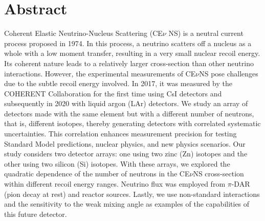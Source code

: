 \chapter*{Abstract}

Coherent Elastic Neutrino-Nucleus Scattering (CE$\nu$ NS) is a neutral current process proposed in 1974. In this process, a neutrino scatters off a nucleus as a whole with a low moment transfer, resulting in a very small nuclear recoil energy. Its coherent nature leads to a relatively larger cross-section than other neutrino interactions. However, the experimental measurements of CE$\nu$NS pose challenges due to the subtle recoil energy involved. In 2017, it was measured by the COHERENT Collaboration for the first time using CsI detectors and subsequently in 2020 with liquid argon (LAr) detectors. We study an array of detectors made with the same element but with a different number of neutrons, that is, different isotopes, thereby generating detectors with correlated systematic uncertainties. This correlation enhances measurement precision for testing Standard Model predictions, nuclear physics, and new physics scenarios. Our study considers two detector arrays: one using two zinc (Zn) isotopes and the other using two silicon (Si) isotopes. With these arrays, we explored the quadratic dependence of the number of neutrons in the CE$\nu$NS cross-section within different recoil energy ranges. Neutrino flux was employed from $\pi$-DAR (pion decay at rest) and reactor sources. Lastly, we use non-standard interactions and the sensitivity to the weak mixing angle as examples of the capabilities of this future detector.


